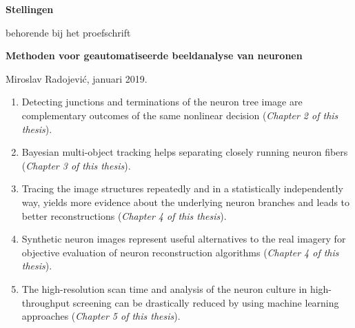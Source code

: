\documentclass[10pt]{report}
\begin{document}
\pagestyle{empty}
\setlength{\leftmargini}{0em}

\begin{center}
  {\Large\bf Stellingen}

  \medskip

  behorende bij het proefschrift

  \medskip

  {\large\bf  Methoden voor geautomatiseerde beeldanalyse van neuronen}

  \medskip

  Miroslav Radojevi\'{c}, januari 2019.
\end{center}

\bigskip
\small

\begin{enumerate}
  
\item Detecting junctions and terminations of the neuron tree image are complementary outcomes of the same nonlinear decision (\emph{Chapter 2 of this thesis}).

\medskip
  
\item Bayesian multi-object tracking helps separating closely running neuron fibers (\emph{Chapter 3 of this thesis}).  
\medskip

\item Tracing the image structures repeatedly and in a statistically independently way, yields more evidence about the underlying neuron branches and leads to better reconstructions (\emph{Chapter 4 of this thesis}).
	
\medskip

\item Synthetic neuron images represent useful alternatives to the real imagery for objective evaluation of neuron reconstruction algorithms (\emph{Chapter 4 of this thesis}).
\medskip

\item The high-resolution scan time and analysis of the neuron culture in high-throughput screening can be drastically reduced by using machine learning approaches (\emph{Chapter 5 of this thesis}).


\end{enumerate}
\end{document}
